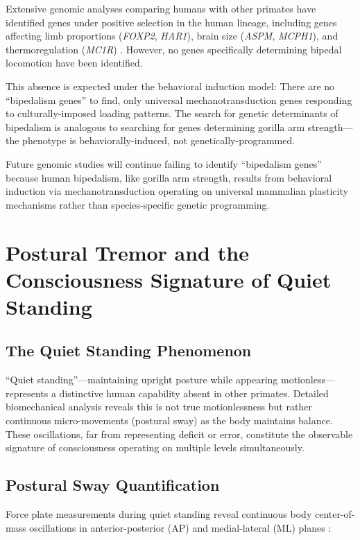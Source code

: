 \documentclass[12pt,a4paper]{article}
\begin{document}
Extensive genomic analyses comparing humans with other primates have identified genes under positive selection in the human lineage, including genes affecting limb proportions (\textit{FOXP2}, \textit{HAR1}), brain size (\textit{ASPM}, \textit{MCPH1}), and thermoregulation (\textit{MC1R}) \citep{varki2008comparing,sabeti2006positive}. However, no genes specifically determining bipedal locomotion have been identified.

This absence is expected under the behavioral induction model: There are no ``bipedalism genes'' to find, only universal mechanotransduction genes responding to culturally-imposed loading patterns. The search for genetic determinants of bipedalism is analogous to searching for genes determining gorilla arm strength—the phenotype is behaviorally-induced, not genetically-programmed.

Future genomic studies will continue failing to identify ``bipedalism genes'' because human bipedalism, like gorilla arm strength, results from behavioral induction via mechanotransduction operating on universal mammalian plasticity mechanisms rather than species-specific genetic programming.

\section{Postural Tremor and the Consciousness Signature of Quiet Standing}
\subsection{The Quiet Standing Phenomenon}

``Quiet standing''—maintaining upright posture while appearing motionless—represents a distinctive human capability absent in other primates. Detailed biomechanical analysis reveals this is not true motionlessness but rather continuous micro-movements (postural sway) as the body maintains balance. These oscillations, far from representing deficit or error, constitute the observable signature of consciousness operating on multiple levels simultaneously.

\subsection{Postural Sway Quantification}

Force plate measurements during quiet standing reveal continuous body center-of-mass oscillations in anterior-posterior (AP) and medial-lateral (ML) planes \citep{winter1995human}:
\end{document}
